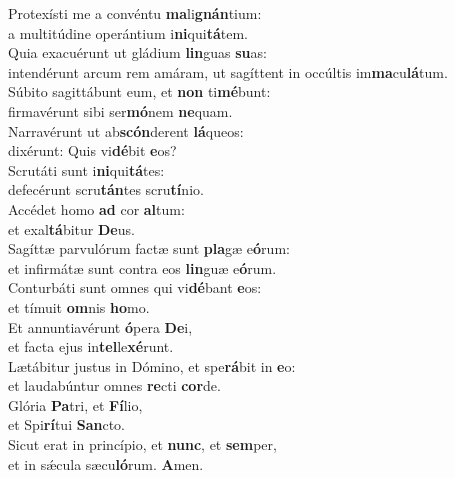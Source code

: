 \evenverse Protexísti me a convéntu \textbf{ma}li\textbf{gnán}tium:~\*\\
\evenverse a multitúdine operántium i\textbf{ni}qui\textbf{tá}tem.\\
\oddverse Quia exacuérunt ut gládium \textbf{lin}guas \textbf{su}as:~\*\\
\oddverse intendérunt arcum rem amáram, ut sagíttent in occúltis im\textbf{ma}cu\textbf{lá}tum.\\
\evenverse Súbito sagittábunt eum, et \textbf{non} ti\textbf{mé}bunt:~\*\\
\evenverse firmavérunt sibi ser\textbf{mó}nem \textbf{ne}quam.\\
\oddverse Narravérunt ut ab\textbf{scón}derent \textbf{lá}queos:~\*\\
\oddverse dixérunt: Quis vi\textbf{dé}bit \textbf{e}os?\\
\evenverse Scrutáti sunt i\textbf{ni}qui\textbf{tá}tes:~\*\\
\evenverse defecérunt scru\textbf{tán}tes scru\textbf{tí}nio.\\
\oddverse Accédet homo \textbf{ad} cor \textbf{al}tum:~\*\\
\oddverse et exal\textbf{tá}bitur \textbf{De}us.\\
\evenverse Sagíttæ parvulórum factæ sunt \textbf{pla}gæ e\textbf{ó}rum:~\*\\
\evenverse et infirmátæ sunt contra eos \textbf{lin}guæ e\textbf{ó}rum.\\
\oddverse Conturbáti sunt omnes qui vi\textbf{dé}bant \textbf{e}os:~\*\\
\oddverse et tímuit \textbf{om}nis \textbf{ho}mo.\\
\evenverse Et annuntiavérunt \textbf{ó}pera \textbf{De}i,~\*\\
\evenverse et facta ejus in\textbf{tel}le\textbf{xé}runt.\\
\oddverse Lætábitur justus in Dómino, et spe\textbf{rá}bit in \textbf{e}o:~\*\\
\oddverse et laudabúntur omnes \textbf{re}cti \textbf{cor}de.\\
\evenverse Glória \textbf{Pa}tri, et \textbf{Fí}lio,~\*\\
\evenverse et Spi\textbf{rí}tui \textbf{San}cto.\\
\oddverse Sicut erat in princípio, et \textbf{nunc}, et \textbf{sem}per,~\*\\
\oddverse et in sǽcula sæcu\textbf{ló}rum. \textbf{A}men.\\
